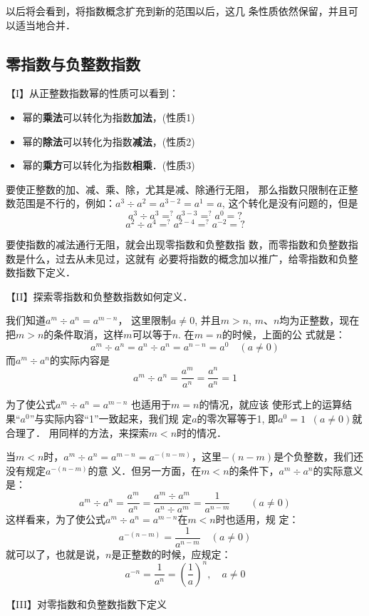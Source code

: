 以后将会看到，将指数概念扩充到新的范围以后，这几
条性质依然保留，并且可以适当地合并．

\subsection{零指数与负整数指数}

【I】从正整数指数幂的性质可以看到：
\begin{itemize}
    \item 幂的\textbf{乘法}可以转化为指数\textbf{加法}，(性质1)
    \item 幂的\textbf{除法}可以转化为指数\textbf{减法}，(性质2)
    \item 幂的\textbf{乘方}可以转化为指数\textbf{相乘}．(性质3)
\end{itemize}

要使正整数的加、减、乘、除，尤其是减、除通行无阻，
那么指数只限制在正整数范围是不行的，例如：$a^3\div a^2=
a^{3-2}=a^1=a$, 这个转化是没有问题的，但是
\[a^3\div a^3 \mathop{=}^{?} a^{3-3} \mathop{=}^{?} a^0=?\]
\[a^2\div a^4 \mathop{=}^{?} a^{2-4} \mathop{=}^{?} a^{-2}=?\]

要使指数的减法通行无阻，就会出现零指数和负整数指
数，而零指数和负整数指数是什么，过去从未见过，这就有
必要将指数的概念加以推广，给零指数和负整数指数下定义．

【II】探索零指数和负整数指数如何定义．

我们知道$a^m\div a^n=a^{m-n}$，
这里限制$a\ne 0$, 并且$m>n$, $m$、$n$均为正整数，现在把$m>
n$的条件取消，这样$m$可以等于$n$. 在$m=n$的时候，上面的公
式就是：
\[a^m\div a^n=a^n\div a^n=a^{n-n}=a^0\quad (a\ne 0)\]
而$a^m\div a^n$的实际内容是
\[a^m\div a^n=\frac{a^m}{a^n}=\frac{a^n}{a^n}=1\]

为了使公式$a^m\div a^n=a^{m-n}$
也适用于$m=n$的情况，就应该
使形式上的运算结果“$a^0$”与实际内容“1”一致起来，我们规
定$a$的零次幂等于1, 即$a^0=1\;\;  (a\ne 0)$就合理了．
用同样的方法，来探索$m<n$时的情况．

当$m<n$时，$a^m\div a^n=a^{m-n}=a^{-(n-m)}$，这里$-(n-m)$是个负整数，我们还没有规定$a^{-(n-m)}$的意
义．但另一方面，在$m<n$的条件下，$a^m\div a^n$的实际意义是：
\[a^m\div a^n=\frac{a^m}{a^n}=\frac{a^m\div a^m}{a^n\div a^m}=\frac{1}{a^{n-m}}\qquad (a\ne 0)\]
这样看来，为了使公式$a^m\div a^n=a^{m-n}$在$m<n$时也适用，规
定：
\[a^{-(n-m)}=\frac{1}{a^{n-m}}\quad (a\ne 0)  \]
就可以了，也就是说，$n$是正整数的时候，应规定：
\[a^{-n}=\frac{1}{a^n}=\left(\frac{1}{a}\right)^n,\quad a\ne 0\]

【III】对零指数和负整数指数下定义

